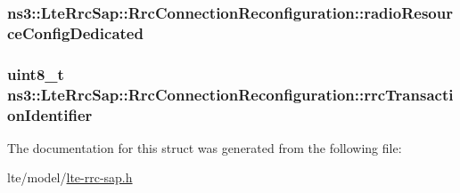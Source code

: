 \subsubsection[{\texorpdfstring{radio\+Resource\+Config\+Dedicated}{radioResourceConfigDedicated}}]{ ns3\+::\+Lte\+Rrc\+Sap\+::\+Rrc\+Connection\+Reconfiguration\+::radio\+Resource\+Config\+Dedicated}\hypertarget{structns3_1_1LteRrcSap_1_1RrcConnectionReconfiguration_a803894f5c17e218bdc8e81957ce5a536}{}\label{structns3_1_1LteRrcSap_1_1RrcConnectionReconfiguration_a803894f5c17e218bdc8e81957ce5a536}
\subsubsection[{\texorpdfstring{rrc\+Transaction\+Identifier}{rrcTransactionIdentifier}}]{\setlength{\rightskip}{0pt plus 5cm}uint8\+\_\+t ns3\+::\+Lte\+Rrc\+Sap\+::\+Rrc\+Connection\+Reconfiguration\+::rrc\+Transaction\+Identifier}\hypertarget{structns3_1_1LteRrcSap_1_1RrcConnectionReconfiguration_a0d45b1c58498cbc262752e45db1d3ac5}{}\label{structns3_1_1LteRrcSap_1_1RrcConnectionReconfiguration_a0d45b1c58498cbc262752e45db1d3ac5}


The documentation for this struct was generated from the following file\+:\begin{DoxyCompactItemize}
\item 
lte/model/\hyperlink{lte-rrc-sap_8h}{lte-\/rrc-\/sap.\+h}\end{DoxyCompactItemize}

